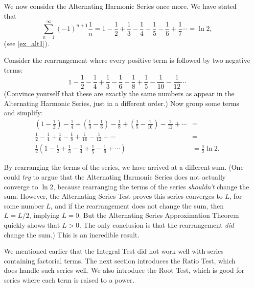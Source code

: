 We now consider the Alternating Harmonic Series once more. We have stated that 
\[
\sum_{n=1}^\infty (-1)^{n+1}\frac1n
= 1-\frac12+\frac13-\frac14+\frac15-\frac16+\frac17\dotsb = \ln 2,
\]
(see \autoref{ex_alt1}). 

Consider the rearrangement where every positive term is followed by two negative terms:
\[
1-\frac12-\frac14+\frac13-\frac16-\frac18+\frac15-\frac1{10}-\frac1{12}\dotsb
\]
(Convince yourself that these are exactly the same numbers as appear in the Alternating Harmonic Series, just in a different order.) Now group some terms and simplify:
\begin{align*}
\left(1-\frac12\right)-\frac14+\left(\frac13-\frac16\right)-\frac18
+\left(\frac15-\frac1{10}\right)-\frac1{12}+\dotsb &= \\
\frac12-\frac14+\frac16-\frac18+\frac1{10}-\frac{1}{12}+\dotsb &= \\
\frac12\left(1-\frac12+\frac13-\frac14+\frac15-\frac16+\dotsb\right) & = \frac12\ln 2.
\end{align*}

By rearranging the terms of the series, we have arrived at a different sum. (One could \emph{try} to argue that the Alternating Harmonic Series does not actually converge to $\ln 2$, because rearranging the terms of the series \emph{shouldn't} change the sum. However, the Alternating Series Test proves this series converges to $L$, for some number $L$, and if the rearrangement does not change the sum, then $L = L/2$, implying $L=0$. But the Alternating Series Approximation Theorem quickly shows that $L>0$. The only conclusion is that the rearrangement \emph{did} change the sum.) This is an incredible result.\bigskip


We mentioned earlier that the Integral Test did not work well with series containing factorial terms. The next section introduces the Ratio Test, which does handle such series well. We also introduce the Root Test, which is good for series where each term is raised to a power.

